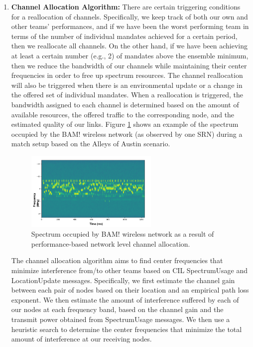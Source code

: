 \documentclass[11pt]{article}
\begin{document}
\begin{enumerate}
     \item \textbf{Channel Allocation Algorithm:}
     There are certain triggering conditions for a reallocation of channels. Specifically, we keep track of both our own and other teams' performances, and if we have been the worst performing team in terms of the number of individual mandates achieved for a certain period, then we reallocate all channels. On the other hand, if we have been achieving at least a certain number (e.g., 2) of mandates above the ensemble minimum, then we reduce the bandwidth of our channels while maintaining their center frequencies in order to free up spectrum resources. The channel reallocation will also be triggered when there is an environmental update or a change in the offered set of individual mandates. When a reallocation is triggered, the bandwidth assigned to each channel is determined based on the amount of available resources, the offered traffic to the corresponding node, and the estimated quality of our links. Figure \ref{fg:ChanAllocEx} shows an example of the spectrum occupied by the BAM! wireless network (as observed by one SRN) during a match setup based on the Alleys of Austin scenario.
     \begin{figure} [htb]
     \centerline{
     \includegraphics[width = 0.6\textwidth]{Figures/ChanAllocEx.png}}
     \caption{Spectrum occupied by BAM! wireless network as a result of performance-based network level channel allocation.}
     \label{fg:ChanAllocEx}
     \end{figure}

     The channel allocation algorithm aims to find center frequencies that minimize interference from/to other teams based on CIL SpectrumUsage and LocationUpdate messages. Specifically, we first estimate the channel gain between each pair of nodes based on their location and an empirical path loss exponent. We then estimate the amount of interference suffered by each of our nodes at each frequency band, based on the channel gain and the transmit power obtained from SpectrumUsage messages. We then use a heuristic search to determine the center frequencies that minimize the total amount of interference at our receiving nodes.
 \end{enumerate}
 
\end{document}
